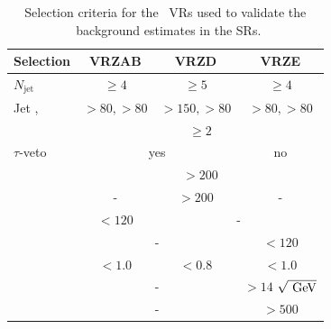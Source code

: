 		\begin{table}[htpb]
		  \caption{Selection criteria for the \Zboson\ \acp{VR} used
		    to validate the \Zboson\ background estimates in the \acp{SR}.} 
		  \begin{center}
		    \def\arraystretch{1.4}
		    \begin{tabular}{lccc}
		      \toprule
		      \textbf{Selection}           & \textbf{VRZAB}                    & \textbf{VRZD}           & \textbf{VRZE}          \\
		      \toprule
		      $N_{\mathrm{jet}}$     & $\ge4$                   & $\ge5$         & $\ge4$        \\
		      Jet \ptzero, \ptone & $>80, >80 $ \GeV            & $>150, >80 $ \GeV & $>80, >80 $ \GeV \\
		      \nBJet              & \multicolumn{3}{c}{$ \ge2 $}                              \\ \midrule
		      $\tau$-veto         & \multicolumn{2}{c}{yes} & no                             \\ \midrule
		      \mtbmin             & \multicolumn{3}{c}{$>200$ \gev}                            \\
		      \mtbmax             & -                        & $>200$ \gev     & -             \\
		      \mantikttwelvezero  & $ <120 $ \gev             & \multicolumn{2}{c}{-}          \\
		      \mantikteightzero   & \multicolumn{2}{c}{-}   & $ <120 $ \gev                   \\ \midrule
		      \drbb               & $<1.0$                   & $<0.8$         & $<1.0$        \\
		      \htsig              & \multicolumn{2}{c}{-}   & $>14$ $\sqrt{\gev}$            \\
		      \HT                 & \multicolumn{2}{c}{-}   & $>500$ \gev                     \\ \bottomrule
		    \end{tabular}
		  \end{center}
		  \label{tab:selectionVRZs}
		\end{table}

